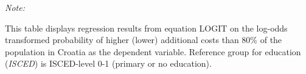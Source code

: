 \begin{table}[htbp!]
\begin{adjustbox}{width = 1\textwidth, max height = 0.95\textheight, center}
\begin{threeparttable}[b]
         \begin{tablenotes}\item \medskip \textit{Note:}
            \item This table displays regression results from equation LOGIT on the log-odds transformed probability of higher (lower) additional costs than 80\% of the population in Croatia as the dependent variable. Reference group for education (\textit{ISCED}) is ISCED-level 0-1 (primary or no education).
         \end{tablenotes}
      \end{threeparttable}
   \end{adjustbox}
\end{table}


